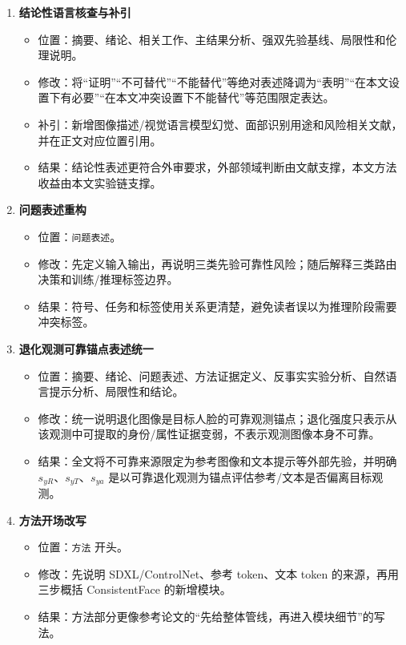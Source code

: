 \documentclass[UTF8,a4paper,zihao=-4]{ctexart}
\begin{document}
\begin{enumerate}
  \item \textbf{结论性语言核查与补引}
  \begin{itemize}
    \item 位置：摘要、绪论、相关工作、主结果分析、强双先验基线、局限性和伦理说明。
    \item 修改：将“证明”“不可替代”“不能替代”等绝对表述降调为“表明”“在本文设置下有必要”“在本文冲突设置下不能替代”等范围限定表达。
    \item 补引：新增图像描述/视觉语言模型幻觉、面部识别用途和风险相关文献，并在正文对应位置引用。
    \item 结果：结论性表述更符合外审要求，外部领域判断由文献支撑，本文方法收益由本文实验链支撑。
  \end{itemize}

  \item \textbf{问题表述重构}
  \begin{itemize}
    \item 位置：\texttt{问题表述}。
    \item 修改：先定义输入输出，再说明三类先验可靠性风险；随后解释三类路由决策和训练/推理标签边界。
    \item 结果：符号、任务和标签使用关系更清楚，避免读者误以为推理阶段需要冲突标签。
  \end{itemize}

  \item \textbf{退化观测可靠锚点表述统一}
  \begin{itemize}
    \item 位置：摘要、绪论、问题表述、方法证据定义、反事实实验分析、自然语言提示分析、局限性和结论。
    \item 修改：统一说明退化图像是目标人脸的可靠观测锚点；退化强度只表示从该观测中可提取的身份/属性证据变弱，不表示观测图像本身不可靠。
    \item 结果：全文将不可靠来源限定为参考图像和文本提示等外部先验，并明确 $s_{yR}$、$s_{yT}$、$s_{ya}$ 是以可靠退化观测为锚点评估参考/文本是否偏离目标观测。
  \end{itemize}

  \item \textbf{方法开场改写}
  \begin{itemize}
    \item 位置：\texttt{方法} 开头。
    \item 修改：先说明 SDXL/ControlNet、参考 token、文本 token 的来源，再用三步概括 ConsistentFace 的新增模块。
    \item 结果：方法部分更像参考论文的“先给整体管线，再进入模块细节”的写法。
  \end{itemize}


\end{enumerate}
\end{document}
